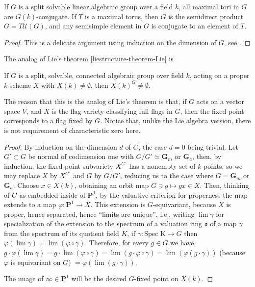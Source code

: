 \begin{proposition}
 \label{proposition-Levi-solvable}
If $G$ is a split solvable linear algebraic group over a field $k$, all maximal tori in $G$ are $G(k)$-conjugate. If $T$ is a maximal torus, then $G$ is the semidirect product $G=T\mathcal U(G)$, and any semisimple element in $G$ is conjugate to an element of $T$. 
\end{proposition}

\begin{proof}
 This is a delicate argument using induction on the dimension of $G$, see \cite[Theorem 10.6]{Borel-LAG}. 
\end{proof}





The analog of Lie's theorem \ref{liestructure-theorem-Lie} is 
\begin{theorem}
\label{theorem-Borel-fixed-point}
 If $G$ is a split, solvable, connected algebraic group over field $k$, acting on a proper $k$-scheme $X$ with $X(k)\ne \emptyset$, then $X(k)^G\ne \emptyset$. 
\end{theorem}

The reason that this is the analog of Lie's theorem is that, if $G$ acts on a vector space $V$, and $X$ is the flag variety classifying full flags in $G$, then the fixed point corresponds to a flag fixed by $G$. Notice that, unlike the Lie algebra version, there is not requirement of characteristic zero here.

\begin{proof}
 By induction on the dimension $d$ of $G$, the case $d=0$ being trivial. Let $G'\subset G$ be normal of codimension one with $G/G'\simeq \mathbf G_m$ or $\mathbf G_a$, then, by induction, the fixed-point subvariety $X^{G'}$ has a nonempty set of $k$-points, so we may replace $X$ by $X^{G'}$ and $G$ by $G/G'$, reducing us to the case where $G=\mathbf G_m$ or $\mathbf G_a$. Choose $x\in X(k)$, obtaining an orbit map $G\ni g\mapsto gx\in X$.  Then, thinking of $G$ as embedded inside of $\mathbf P^1$, by the valuative criterion for properness the map extends to a map $\varphi:\mathbf P^1\to X$. This extension is $G$-equivariant, because $X$ is proper, hence separated, hence ``limits are unique'', i.e., writing $\lim \gamma$ for specialization of the extension to the spectrum of a valuation ring $\mathfrak o$ of a map $\gamma$ from the spectrum of its quotient field $K$, if $\gamma: \text{Spec K} \to G$ then $\varphi(\lim \gamma) = \lim (\varphi \circ \gamma)$. Therefore, for every $g\in G$ we have $g\cdot \varphi(\lim \gamma) = g\cdot \lim (\varphi\circ\gamma) = \lim( g\cdot \varphi\circ\gamma) = \lim(\varphi(g\cdot \gamma))$ (because $\varphi$ is equivariant on $G$) $= \varphi(\lim (g\cdot\gamma))$. 
 
 The image of $\infty\in \mathbf P^1$ will be the desired $G$-fixed point on $X(k)$.
\end{proof}




